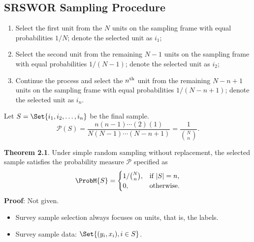 \documentclass[oneside]{book}\usepackage[]{graphicx}\usepackage[svgnames]{xcolor}
\DeclarePairedDelimiter\abs{\lvert}{\rvert}
\begin{document}
\subsection*{SRSWOR Sampling Procedure}
\begin{Regular}{}
      \begin{enumerate}[(1)]
            \item Select the first unit from the $N$ units on the sampling frame with
                  equal probabilities $1/N$; denote the selected unit as $i_1$;
            \item Select the second unit from the remaining $ N-1 $ units on the
                  sampling frame with equal probabilities $ 1/(N-1) $; denote the
                  selected unit as $i_2$;
            \item Continue the process and select the $n\textsuperscript{th}$ unit from the remaining
                  $ N-n+1 $ units on the sampling frame with equal probabilities
                  $ 1/(N-n+1) $; denote the selected unit as $ i_n $.
      \end{enumerate}
\end{Regular}
Let $ S=\Set{i_1,i_2,\ldots,i_n} $ be the final sample.
\[ \mathcal{P}(S)=\frac{n(n-1)\cdots(2)(1)}{N(N-1)\cdots(N-n+1)}=\frac{1}{\binom{N}{n}}. \]
\begin{Result}{}
      \textbf{Theorem 2.1}. Under simple random sampling without replacement,
      the selected sample satisfies the probability measure $ \mathcal{P} $ specified as
      \[ \ProbM{S}=\begin{cases}
                  1/\binom{N}{n}, & \text{if $ \abs{S}=n $}, \\
                  0,              & \text{otherwise}.
            \end{cases} \]
      \tcblower{}
      \textbf{Proof}: Not given.
\end{Result}
\begin{itemize}
      \item Survey sample selection always focuses on units, that is, the labels.
      \item Survey sample data: $ \Set{(y_i,x_i),i\in S} $.
\end{itemize}
\end{document}
